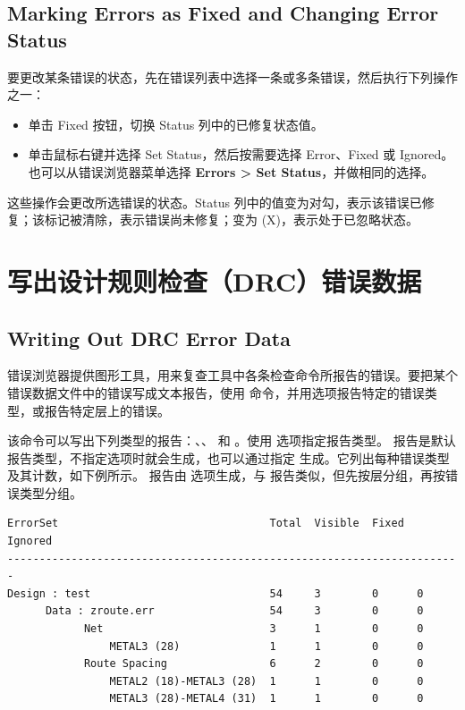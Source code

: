 \subsection*{Marking Errors as Fixed and Changing Error Status}

要更改某条错误的状态，先在错误列表中选择一条或多条错误，然后执行下列操作之一：
\begin{itemize}
  \item 单击 Fixed 按钮，切换 Status 列中的已修复状态值。
  \item 单击鼠标右键并选择 Set Status，然后按需要选择 Error、Fixed 或 Ignored。也可以从错误浏览器菜单选择 \textbf{Errors > Set Status}，并做相同的选择。
\end{itemize}

这些操作会更改所选错误的状态。Status 列中的值变为对勾，表示该错误已修复；该标记被清除，表示错误尚未修复；变为 (X)，表示处于已忽略状态。

\section{写出设计规则检查（DRC）错误数据}
\subsection*{Writing Out DRC Error Data}

错误浏览器提供图形工具，用来复查工具中各条检查命令所报告的错误。要把某个错误数据文件中的错误写成文本报告，使用  命令，并用选项报告特定的错误类型，或报告特定层上的错误。

该命令可以写出下列类型的报告：、、 和 。使用  选项指定报告类型。 报告是默认报告类型，不指定选项时就会生成，也可以通过指定  生成。它列出每种错误类型及其计数，如下例所示。 报告由  选项生成，与  报告类似，但先按层分组，再按错误类型分组。

\begin{lstlisting}
ErrorSet                                 Total  Visible  Fixed  Ignored
-----------------------------------------------------------------------
Design : test                            54     3        0      0
      Data : zroute.err                  54     3        0      0
            Net                          3      1        0      0
                METAL3 (28)              1      1        0      0
            Route Spacing                6      2        0      0
                METAL2 (18)-METAL3 (28)  1      1        0      0
                METAL3 (28)-METAL4 (31)  1      1        0      0
\end{lstlisting}

